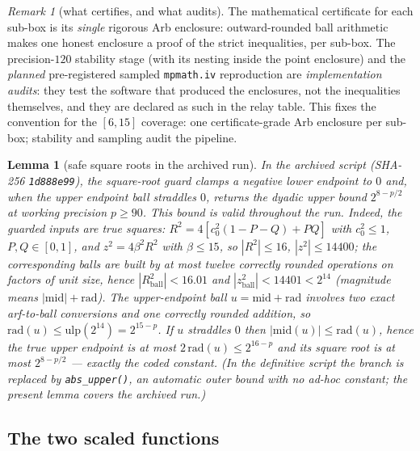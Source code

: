 \documentclass[11pt]{article}
\newtheorem{lemma}[theorem]{Lemma}
\theoremstyle{remark}
\newtheorem{remark}[theorem]{Remark}
\begin{document}
\begin{remark}[what certifies, and what audits]
\label{rem:certaudit}
The mathematical certificate for each sub-box is its \emph{single}
rigorous Arb enclosure: outward-rounded ball arithmetic makes one
honest enclosure a proof of the strict inequalities, per sub-box.
The precision-$120$ stability stage (with its nesting inside the
point enclosure) and the \emph{planned} pre-registered sampled
\texttt{mpmath.iv} reproduction are \emph{implementation audits}:
they test the
software that produced the enclosures, not the inequalities
themselves, and they are declared as such in the relay table. This
fixes the convention for the $[6,15]$ coverage: one certificate-grade
Arb enclosure per sub-box; stability and sampling audit the pipeline.
\end{remark}

\begin{lemma}[safe square roots in the archived run]
\label{lem:dormant}
In the archived script (\textup{SHA-256} \texttt{1d888e99}), the
square-root guard clamps a negative lower endpoint to $0$ and, when
the \emph{upper} endpoint ball straddles $0$, returns the dyadic
upper bound $2^{8-p/2}$ at working precision $p\ge90$. This bound is
valid throughout the run. Indeed, the guarded inputs are true
squares: $R^2=4[c_0^2(1-P-Q)+PQ]$ with $c_0^2\le1$, $P,Q\in[0,1]$,
and $z^2=4\beta^2R^2$ with $\beta\le15$, so $|R^2|\le16$,
$|z^2|\le14400$; the corresponding \emph{balls} are built by at most
twelve correctly rounded operations on factors of unit size, hence
$|R^2_{\mathrm{ball}}|<16.01$ and $|z^2_{\mathrm{ball}}|<14401<2^{14}$
(magnitude means $|\mathrm{mid}|+\mathrm{rad}$). The upper-endpoint
ball $u=\mathrm{mid}+\mathrm{rad}$ involves two exact arf-to-ball
conversions and one correctly rounded addition, so
$\mathrm{rad}(u)\le\mathrm{ulp}(2^{14})=2^{15-p}$. If $u$ straddles
$0$ then $|\mathrm{mid}(u)|\le\mathrm{rad}(u)$, hence the true upper
endpoint is at most $2\,\mathrm{rad}(u)\le2^{16-p}$ and its square
root is at most $2^{8-p/2}$ --- exactly the coded constant. (In the
definitive script the branch is replaced by
\texttt{abs\_upper()}, an automatic outer bound with no ad-hoc
constant; the present lemma covers the archived run.)
\end{lemma}

\subsection*{The two scaled functions}
\end{document}
